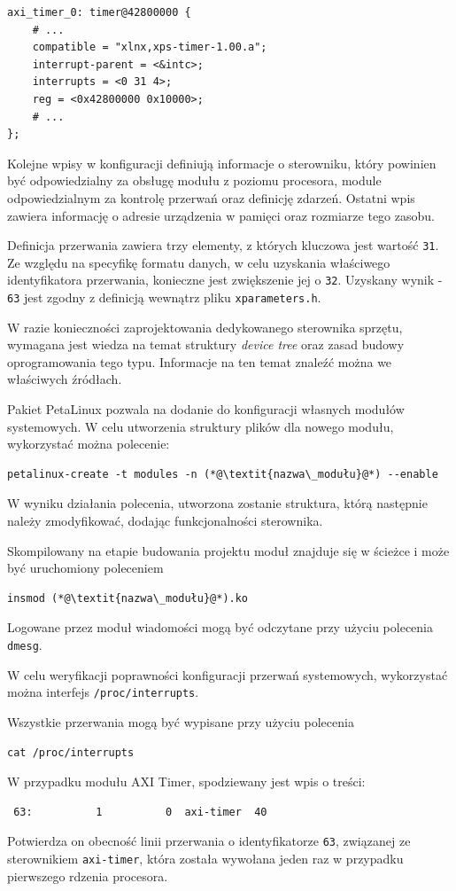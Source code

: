 \begin{lstlisting}
axi_timer_0: timer@42800000 {
	# ...
	compatible = "xlnx,xps-timer-1.00.a";
	interrupt-parent = <&intc>;
	interrupts = <0 31 4>;
	reg = <0x42800000 0x10000>;
	# ...
};
\end{lstlisting}
Kolejne wpisy w konfiguracji definiują informacje o sterowniku, który powinien być odpowiedzialny za obsługę modułu z poziomu procesora, module odpowiedzialnym za kontrolę przerwań oraz definicję zdarzeń. Ostatni wpis zawiera informację o adresie urządzenia w pamięci oraz rozmiarze tego zasobu.

Definicja przerwania zawiera trzy elementy, z których kluczowa jest wartość \texttt{31}. Ze względu na specyfikę formatu danych, w celu uzyskania właściwego identyfikatora przerwania, konieczne jest zwiększenie jej o \texttt{32}. Uzyskany wynik - \texttt{63} jest zgodny z definicją wewnątrz pliku \texttt{xparameters.h}.

W razie konieczności zaprojektowania dedykowanego sterownika sprzętu, wymagana jest wiedza na temat struktury \textit{device tree} oraz zasad budowy oprogramowania tego typu. Informacje na ten temat znaleźć można we właściwych źródłach. \cite{Corbet2005,device-tree-tutorial}

Pakiet PetaLinux pozwala na dodanie do konfiguracji własnych modułów systemowych. W celu utworzenia struktury plików dla nowego modułu, wykorzystać można polecenie:

\begin{lstlisting}[breaklines=true]
petalinux-create -t modules -n (*@\textit{nazwa\_modułu}@*) --enable
\end{lstlisting}

W wyniku działania polecenia, utworzona zostanie struktura, którą następnie należy zmodyfikować, dodając funkcjonalności sterownika.

Skompilowany na etapie budowania projektu moduł znajduje się w ścieżce  i może być uruchomiony poleceniem

\begin{lstlisting}
insmod (*@\textit{nazwa\_modułu}@*).ko
\end{lstlisting}

Logowane przez moduł wiadomości mogą być odczytane przy użyciu polecenia \texttt{dmesg}.

W celu weryfikacji poprawności konfiguracji przerwań systemowych, wykorzystać można interfejs \texttt{/proc/interrupts}.

Wszystkie przerwania mogą być wypisane przy użyciu polecenia

\begin{lstlisting}
cat /proc/interrupts
\end{lstlisting}

W przypadku modułu AXI Timer, spodziewany jest wpis o treści:
\begin{lstlisting}
 63:          1          0  axi-timer  40
\end{lstlisting}
Potwierdza on obecność linii przerwania o identyfikatorze \texttt{63}, związanej ze sterownikiem \texttt{axi-timer}, która została wywołana jeden raz w przypadku pierwszego rdzenia procesora.